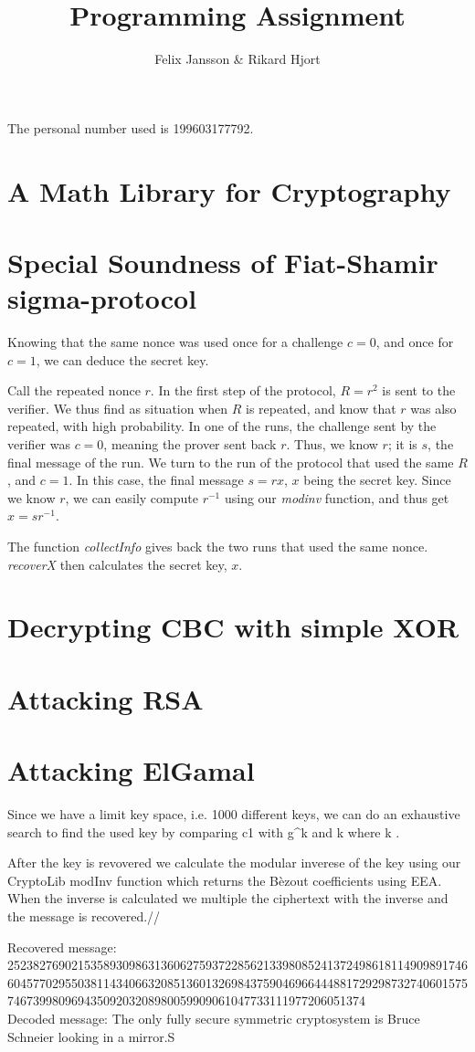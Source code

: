 \documentclass{article}
\author{Felix Jansson \& Rikard Hjort}
\title{Programming Assignment}
\begin{document}
The personal number used is 199603177792.

\section{A Math Library for Cryptography}

\section{Special Soundness of Fiat-Shamir sigma-protocol}
Knowing that the same nonce was used once for a challenge $c=0$, and once for
$c=1$, we can deduce the secret key.

Call the repeated nonce $r$. In the first step of the protocol, $R=r^2$ is sent
to the verifier. We thus find as situation when $R$ is repeated, and know that
$r$ was also repeated, with high probability. In one of the runs, the
challenge sent by the verifier was $c=0$, meaning the prover sent back $r$.
Thus, we know $r$; it is $s$, the final message of the run. We turn to the run
of the protocol that used the same $R$, and $c=1$. In this case, the final
message $s=rx$, $x$ being the secret key. Since we know $r$, we can easily
compute $r^{-1}$ using our \textit{modinv} function, and thus get $x=sr^{-1}$.

The function \textit{collectInfo} gives back the two runs that used the same
nonce. \textit{recoverX} then calculates the
secret key, $x$.

\section{Decrypting CBC with simple XOR}

\section{Attacking RSA}

\section{Attacking ElGamal}
Since we have a limit key space, i.e. 1000 different keys,  we can do an exhaustive search to find the used key by comparing c1 with g^k and k where k .

After the key is revovered we calculate the modular inverese of the key using our CryptoLib modInv function which returns the Bèzout coefficients using EEA.
When the inverse is calculated we multiple the ciphertext with the inverse and the message is recovered.//

Recovered message: 25238276902153589309863136062759372285621339808524137249861811490989174660457702955038114340663208513601326984375904696644488172929873274060157574673998096943509203208980059909061047733111977206051374 \\
Decoded message: The only fully secure symmetric cryptosystem is Bruce Schneier looking in a mirror.S       
\end{document}
